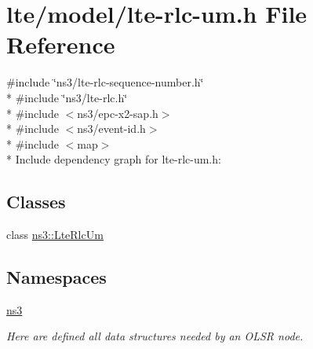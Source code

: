 \hypertarget{lte-rlc-um_8h}{}\section{lte/model/lte-\/rlc-\/um.h File Reference}
\label{lte-rlc-um_8h}
{\ttfamily \#include \char`\"{}ns3/lte-\/rlc-\/sequence-\/number.\+h\char`\"{}}\\*
{\ttfamily \#include \char`\"{}ns3/lte-\/rlc.\+h\char`\"{}}\\*
{\ttfamily \#include $<$ns3/epc-\/x2-\/sap.\+h$>$}\\*
{\ttfamily \#include $<$ns3/event-\/id.\+h$>$}\\*
{\ttfamily \#include $<$map$>$}\\*
Include dependency graph for lte-\/rlc-\/um.h\+:
\subsection*{Classes}
\begin{DoxyCompactItemize}
\item 
class \hyperlink{classns3_1_1LteRlcUm}{ns3\+::\+Lte\+Rlc\+Um}
\end{DoxyCompactItemize}
\subsection*{Namespaces}
\begin{DoxyCompactItemize}
\item 
 \hyperlink{namespacens3}{ns3}
\begin{DoxyCompactList}\small\item\em Here are defined all data structures needed by an O\+L\+SR node. \end{DoxyCompactList}\end{DoxyCompactItemize}

